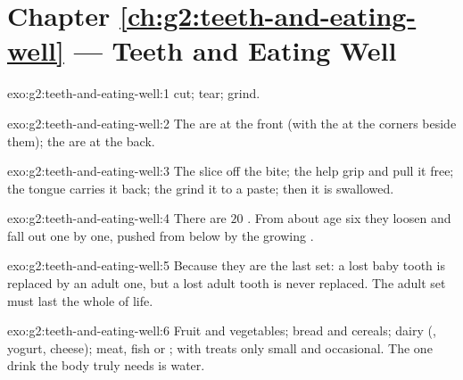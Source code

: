 \section*{Chapter \ref{ch:g2:teeth-and-eating-well} --- Teeth and Eating Well}

\begin{solution}{exo:g2:teeth-and-eating-well:1}
 cut;  tear;  grind.
\end{solution}

\begin{solution}{exo:g2:teeth-and-eating-well:2}
The  are at the front (with the  at the corners
beside them); the  are at the back.
\end{solution}

\begin{solution}{exo:g2:teeth-and-eating-well:3}
The  slice off the bite; the  help grip and pull
it free; the tongue carries it back; the  grind it to a
paste; then it is swallowed.
\end{solution}

\begin{solution}{exo:g2:teeth-and-eating-well:4}
There are $20$ . From about age six they loosen and
fall out one by one, pushed from below by the growing .
\end{solution}

\begin{solution}{exo:g2:teeth-and-eating-well:5}
Because they are the last set: a lost baby tooth is replaced by
an adult one, but a lost adult tooth is never replaced. The adult
set must last the whole of life.
\end{solution}

\begin{solution}{exo:g2:teeth-and-eating-well:6}
Fruit and vegetables; bread and cereals; dairy (, yogurt,
cheese); meat, fish or ; with treats only small and
occasional. The one drink the body truly needs is water.
\end{solution}

